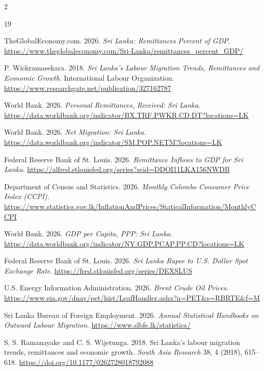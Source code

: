 \documentclass[sigconf]{acmart}
\begin{document}
\clearpage
\onecolumn
\begin{multicols*}{2}
\raggedright


\begin{thebibliography}{19}

TheGlobalEconomy.com. 2026.
\textit{Sri Lanka: Remittances Percent of GDP}.
\url{https://www.theglobaleconomy.com/Sri-Lanka/remittances_percent_GDP/}

P. Wickramasekara. 2018.
\textit{Sri Lanka's Labour Migration Trends, Remittances and Economic Growth}.
International Labour Organization.
\url{https://www.researchgate.net/publication/327162787}

World Bank. 2026.
\textit{Personal Remittances, Received: Sri Lanka}.
\url{https://data.worldbank.org/indicator/BX.TRF.PWKR.CD.DT?locations=LK}

World Bank. 2026.
\textit{Net Migration: Sri Lanka}.
\url{https://data.worldbank.org/indicator/SM.POP.NETM?locations=LK}

Federal Reserve Bank of St. Louis. 2026.
\textit{Remittance Inflows to GDP for Sri Lanka}.
\url{https://alfred.stlouisfed.org/series?seid=DDOI11LKA156NWDB}

Department of Census and Statistics. 2026.
\textit{Monthly Colombo Consumer Price Index (CCPI)}.
\url{https://www.statistics.gov.lk/InflationAndPrices/StaticalInformation/MonthlyCCPI}

World Bank. 2026.
\textit{GDP per Capita, PPP: Sri Lanka}.
\url{https://data.worldbank.org/indicator/NY.GDP.PCAP.PP.CD?locations=LK}

Federal Reserve Bank of St. Louis. 2026.
\textit{Sri Lanka Rupee to U.S. Dollar Spot Exchange Rate}.
\url{https://fred.stlouisfed.org/series/DEXSLUS}

U.S. Energy Information Administration. 2026.
\textit{Brent Crude Oil Prices}.
\url{https://www.eia.gov/dnav/pet/hist/LeafHandler.ashx?n=PET\&s=RBRTE\&f=M}

Sri Lanka Bureau of Foreign Employment. 2026.
\textit{Annual Statistical Handbooks on Outward Labour Migration}.
\url{https://www.slbfe.lk/statistics/}

S. S. Ramanayake and C. S. Wijetunga. 2018.
Sri Lanka's labour migration trends, remittances and economic growth.
\textit{South Asia Research} 38, 4 (2018), 615--618.
\url{https://doi.org/10.1177/0262728018792088}


\end{thebibliography}
\end{multicols*}
\end{document}
